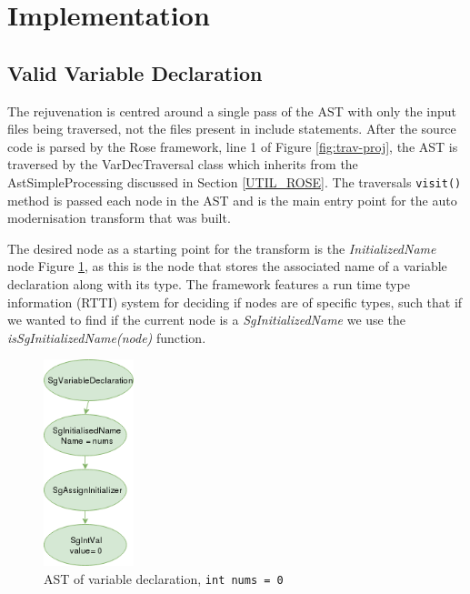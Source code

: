 \documentclass[bsc,frontabs,singlespacing,twoside,parskip,deptreport]{infthesis}
\begin{document}
\section{Implementation}\label{sec:auto-Impl}

\subsection{Valid Variable Declaration}
The rejuvenation is centred around a single pass of the AST with only the input files being traversed, not the files present in include statements. After the source code is parsed by the Rose framework, line 1 of Figure \ref{fig:trav-proj}, the AST is traversed by the VarDecTraversal class which inherits from the AstSimpleProcessing discussed in Section \ref{UTIL_ROSE}. The traversals \texttt{visit()} method is passed each node in the AST and is the main entry point for the auto modernisation transform that was built.

The desired node as a starting point for the transform is the \textit{InitializedName} node Figure \ref{fig:var-dec-ast}, as this is the node that stores the associated name of a variable declaration along with its type. The framework features a run time type information (RTTI) system for deciding if nodes are of specific types, such that if we wanted to find if the current node is a \textit{SgInitializedName} we use the \textit{isSgInitializedName(node)} function.

\begin{figure}[H]
    \centering
    \includegraphics[height=6cm]{images/ast-var-dec.png}
    \caption{AST of variable declaration, \texttt{int nums = 0}}
    \label{fig:var-dec-ast}
\end{figure}
\end{document}
